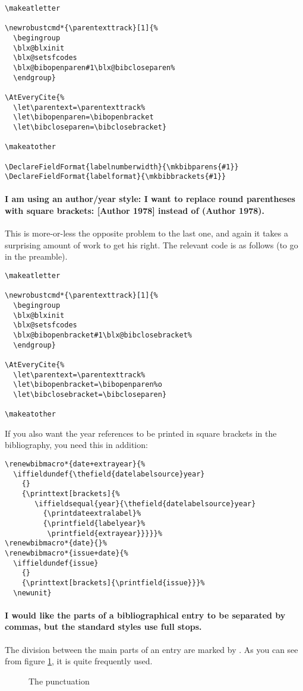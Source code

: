 \begin{Verbatim}
\makeatletter

\newrobustcmd*{\parentexttrack}[1]{%
  \begingroup
  \blx@blxinit
  \blx@setsfcodes
  \blx@bibopenparen#1\blx@bibcloseparen%
  \endgroup}

\AtEveryCite{%
  \let\parentext=\parentexttrack%
  \let\bibopenparen=\bibopenbracket
  \let\bibcloseparen=\bibclosebracket}

\makeatother

\DeclareFieldFormat{labelnumberwidth}{\mkbibparens{#1}}
\DeclareFieldFormat{labelformat}{\mkbibbrackets{#1}}
\end{Verbatim}

\paragraph{I am using an author/year style: I want to replace round
  parentheses with square brackets: [Author 1978] instead of (Author
  1978).} This is more-or-less the opposite problem to the last one,
and again it takes a surprising amount of work to get his right. The
relevant code is as follows (to go in the preamble).
\begin{Verbatim}
\makeatletter

\newrobustcmd*{\parentexttrack}[1]{%
  \begingroup
  \blx@blxinit
  \blx@setsfcodes
  \blx@bibopenbracket#1\blx@bibclosebracket%
  \endgroup}

\AtEveryCite{%
  \let\parentext=\parentexttrack%
  \let\bibopenbracket=\bibopenparen%o
  \let\bibclosebracket=\bibcloseparen}

\makeatother
\end{Verbatim}

If you also want the year references to be printed in square brackets
in the bibliography, you need this in addition:
\begin{Verbatim}
\renewbibmacro*{date+extrayear}{%
  \iffieldundef{\thefield{datelabelsource}year}
    {}
    {\printtext[brackets]{%
       \iffieldsequal{year}{\thefield{datelabelsource}year}
         {\printdateextralabel}%
         {\printfield{labelyear}%
          \printfield{extrayear}}}}}%
\renewbibmacro*{date}{}%
\renewbibmacro*{issue+date}{%
  \iffieldundef{issue}
    {}
    {\printtext[brackets]{\printfield{issue}}}%
  \newunit}
\end{Verbatim}

\paragraph{I would like the parts of a bibliographical entry to be
  separated by commas, but the standard styles use full stops.} The
division between the main parts of an entry are marked by
. As you can see from figure \ref{punctcite10}, it is
quite frequently used.
\begin{figure}
\caption{The  punctuation\label{punctcite10}}
\end{figure}

